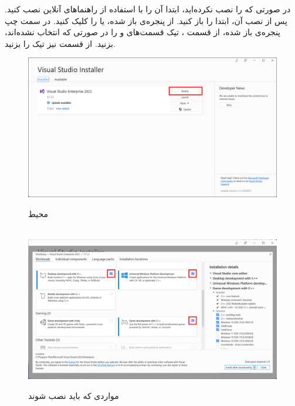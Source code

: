 \title{
    \Large
}

{
    \Large
    در صورتی که  را نصب نکرده‌اید، ابتدا آن را با استفاده از راهنما‌های آنلاین نصب کنید. پس از نصب آن، ابتدا  را باز کنید. از پنجره‌ی باز شده،  یا  را کلیک کنید. در سمت چپ پنجره‌ی باز شده، از قسمت ، تیک قسمت‌های  و  را در صورتی که انتخاب نشده‌اند، بزنید.
از قسمت  نیز تیک  را بزنید.

    \begin{figure}[H]
        \centering
        \setlength{\belowcaptionskip}{-10pt}
        \includegraphics[width=\textwidth]{Images/1.Intro.2.1.png}
        \caption*{محیط }
        \\[20pt]
        \includegraphics[width=\textwidth]{Images/1.Intro.2.2.png}
        \caption*{مواردی که باید نصب شوند}
    \end{figure}


}
